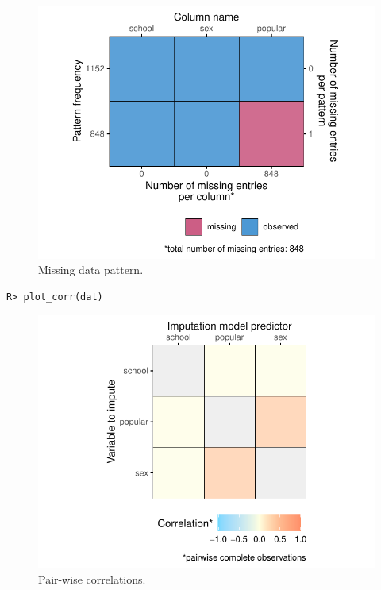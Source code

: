 \documentclass[
  article]{jss}
\begin{document}
\begin{figure}[H]

{\centering \includegraphics{manuscript_files/figure-pdf/fig-pattern-1.pdf}

}

\caption{\label{fig-pattern}Missing data pattern.}

\end{figure}

\begin{verbatim}
R> plot_corr(dat)
\end{verbatim}

\begin{figure}[H]

{\centering \includegraphics{manuscript_files/figure-pdf/unnamed-chunk-5-1.pdf}

}

\caption{Pair-wise correlations.}

\end{figure}
\end{document}
